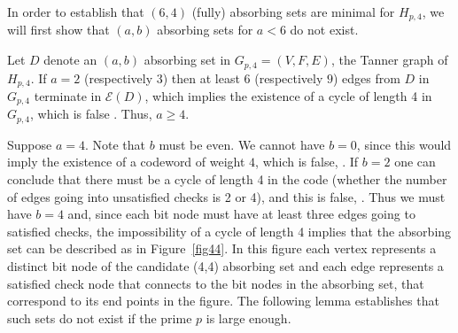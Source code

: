In order to establish that $(6,4)$ (fully) absorbing sets are
minimal for $H_{p,4}$, we will first show that $(a,b)$ absorbing
sets for $a < 6$ do not exist.



Let $D$ denote an $(a,b)$ absorbing set in $G_{p,4}=(V,F,E)$, the
Tanner graph of $H_{p,4}$. If $a=2$ (respectively $3$) then at
least $6$ (respectively $9$) edges from $D$ in $G_{p,4}$ terminate
in $\mathcal{E}(D)$, which implies the existence of a cycle of
length 4 in $G_{p,4}$, which is false \cite{fan}. Thus, $a \geq
4$.


Suppose $a=4$. Note that $b$ must be even. We cannot have $b=0$,
since this would imply the existence of a codeword of weight $4$,
which is false, \cite{helles}. If $b=2$ one can conclude that there
must be a cycle of length 4 in the code (whether the number of edges
going into unsatisfied checks is 2 or 4), and this is false,
\cite{fan}. Thus we must have $b=4$ and, since each bit node must
have at least three edges going to satisfied checks, the
impossibility of a cycle of length 4 \cite{fan} implies that the
absorbing set can be described as in Figure~\ref{fig44}. In this
figure each vertex represents a distinct bit node of the candidate
(4,4) absorbing set and each edge represents a satisfied check node
that connects to the bit nodes in the absorbing set, that correspond
to its end points in the figure. The following lemma establishes
that such sets do not exist if the prime $p$ is large enough.

